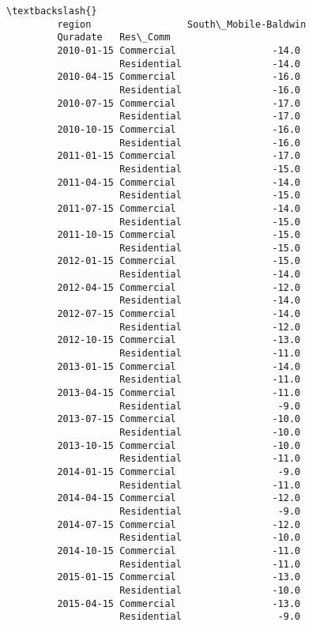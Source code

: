 \documentclass[11pt]{article}
\begin{document}
\begin{Verbatim}[commandchars=\\\{\}]
                                                      \textbackslash{}
         region                 South\_Mobile-Baldwin   
         Quradate   Res\_Comm                           
         2010-01-15 Commercial                 -14.0   
                    Residential                -14.0   
         2010-04-15 Commercial                 -16.0   
                    Residential                -16.0   
         2010-07-15 Commercial                 -17.0   
                    Residential                -17.0   
         2010-10-15 Commercial                 -16.0   
                    Residential                -16.0   
         2011-01-15 Commercial                 -17.0   
                    Residential                -15.0   
         2011-04-15 Commercial                 -14.0   
                    Residential                -15.0   
         2011-07-15 Commercial                 -14.0   
                    Residential                -15.0   
         2011-10-15 Commercial                 -15.0   
                    Residential                -15.0   
         2012-01-15 Commercial                 -15.0   
                    Residential                -14.0   
         2012-04-15 Commercial                 -12.0   
                    Residential                -14.0   
         2012-07-15 Commercial                 -14.0   
                    Residential                -12.0   
         2012-10-15 Commercial                 -13.0   
                    Residential                -11.0   
         2013-01-15 Commercial                 -14.0   
                    Residential                -11.0   
         2013-04-15 Commercial                 -11.0   
                    Residential                 -9.0   
         2013-07-15 Commercial                 -10.0   
                    Residential                -10.0   
         2013-10-15 Commercial                 -10.0   
                    Residential                -11.0   
         2014-01-15 Commercial                  -9.0   
                    Residential                -11.0   
         2014-04-15 Commercial                 -12.0   
                    Residential                 -9.0   
         2014-07-15 Commercial                 -12.0   
                    Residential                -10.0   
         2014-10-15 Commercial                 -11.0   
                    Residential                -11.0   
         2015-01-15 Commercial                 -13.0   
                    Residential                -10.0   
         2015-04-15 Commercial                 -13.0   
                    Residential                 -9.0   

\end{Verbatim}
\end{document}
